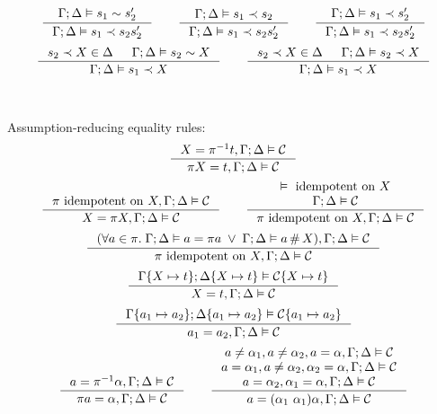 \documentclass[english, mgr]{iithesis}
\begin{document}
\begin{appendices}
$$\inference{
  \cEnv ; \icEnv \vDash \shape_1 \csheq \shape_2'
}{
  \cEnv ; \icEnv \vDash \shape_1 \cshlt \shape_2 \shape_2'
}
\qquad
\inference{
  \cEnv ; \icEnv \vDash \shape_1 \cshlt \shape_2
}{
  \cEnv ; \icEnv \vDash \shape_1 \cshlt \shape_2 \shape_2'
}
\qquad
\inference{
  \cEnv ; \icEnv \vDash \shape_1 \cshlt \shape_2'
}{
  \cEnv ; \icEnv \vDash \shape_1 \cshlt \shape_2 \shape_2'
}
$$
$$\inference{
  \shape_2 \cshlt \termv \in \icEnv
  &
  \cEnv ; \icEnv \vDash \shape_2 \csheq \termv
}{
  \cEnv ; \icEnv \vDash \shape_1 \cshlt \termv
}
\qquad
\inference{
  \shape_2 \cshlt \termv \in \icEnv
  &
  \cEnv ; \icEnv \vDash \shape_2 \cshlt \termv
}{
  \cEnv ; \icEnv \vDash \shape_1 \cshlt \termv
}
$$
\\
\\
Assumption-reducing equality rules:
$$
\inference{
   \termv = \pi^{-1} \term, \cEnv ; \icEnv \vDash \sconstr
}{
   \pi \termv = \term, \cEnv ; \icEnv \vDash \sconstr
}
$$
$$
\inference{
  \pi \text{ idempotent on } \termv, \cEnv ; \icEnv \vDash \sconstr
}{
   \termv = \pi \termv, \cEnv ; \icEnv \vDash \sconstr
}
\qquad
\inference{
  \vDash \text{ idempotent on } \termv \\
  \cEnv ; \icEnv \vDash \sconstr
}{
   \pi \text{ idempotent on } \termv, \cEnv ; \icEnv \vDash \sconstr
}
$$
$$
\inference{
  (\forall \atomv \in \pi.\;
    \cEnv ; \icEnv \vDash \atomv = \pi \atomv \;\vee\;
    \cEnv ; \icEnv \vDash \atomv \cfresh \termv), \cEnv ; \icEnv \vDash \sconstr
}{
\pi \text{ idempotent on } \termv, \cEnv ; \icEnv \vDash \sconstr
}
$$
$$
\inference{
   \cEnv\subst{\termv}{\term} ; \icEnv\subst{\termv}{\term} \vDash \sconstr\subst{\termv}{\term}
}{
   \termv = \term, \cEnv ; \icEnv \vDash \sconstr
}
$$
$$
\inference{
   \cEnv \subst{\atomv_1}{\atomv_2}; \icEnv\subst{\atomv_1}{\atomv_2} \vDash \sconstr\subst{\atomv_1}{\atomv_2}
}{
  \atomv_1 \ceq \atomv_2, \cEnv ; \icEnv \vDash \sconstr
}
$$
$$
\inference{
  \atomv \ceq \pi^{-1} \atomexp, \cEnv ; \icEnv \vDash \sconstr
}{
  \pi \atomv \ceq \atomexp, \cEnv ; \icEnv \vDash \sconstr
}
\qquad
\inference{
  \atomv \cneq \atomexp_1, \atomv \cneq \atomexp_2, \atomv     \ceq \atomexp, \cEnv ; \icEnv \vDash \sconstr \\
  \atomv \ceq  \atomexp_1, \atomv \cneq \atomexp_2, \atomexp_2 \ceq \atomexp, \cEnv ; \icEnv \vDash \sconstr \\
                           \atomv \ceq  \atomexp_2, \atomexp_1 \ceq \atomexp, \cEnv ; \icEnv \vDash \sconstr
}{
  \atomv \ceq \permswap{\atomexp_1}{\atomexp_1} \atomexp, \cEnv ; \icEnv \vDash \sconstr
}$$
\end{appendices}
\end{document}
